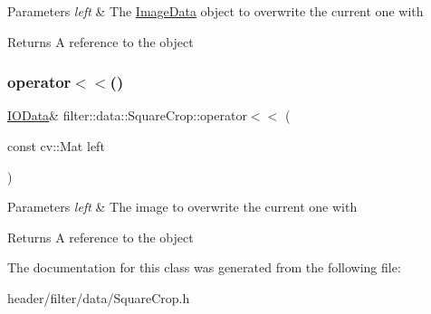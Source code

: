 \begin{DoxyParams}{Parameters}
{\em left} & The \hyperlink{classfilter_1_1data_1_1_image_data}{Image\+Data} object to overwrite the current one with \\
\hline
\end{DoxyParams}
\begin{DoxyReturn}{Returns}
A reference to the object 
\end{DoxyReturn}
\mbox{\label{classfilter_1_1data_1_1_square_crop_a44a6de24b7f945d007c294a959a9a576}} 
\subsubsection{\texorpdfstring{operator$<$$<$()}{operator<<()}\hspace{0.1cm}{\footnotesize\ttfamily [5/5]}}
{\footnotesize\ttfamily \hyperlink{classfilter_1_1data_1_1_i_o_data}{I\+O\+Data}\& filter\+::data\+::\+Square\+Crop\+::operator$<$$<$ (\begin{DoxyParamCaption}\item[{const cv\+::\+Mat}]{left }\end{DoxyParamCaption})\hspace{0.3cm}{\ttfamily [inline]}}


\begin{DoxyParams}{Parameters}
{\em left} & The image to overwrite the current one with \\
\hline
\end{DoxyParams}
\begin{DoxyReturn}{Returns}
A reference to the object 
\end{DoxyReturn}


The documentation for this class was generated from the following file\+:\begin{DoxyCompactItemize}
\item 
header/filter/data/Square\+Crop.\+h\end{DoxyCompactItemize}
